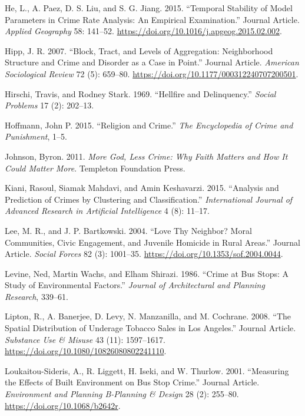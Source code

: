 \documentclass[smallextended]{svjour3}       %
\begin{document}
\leavevmode\hypertarget{ref-He2015temporal}{}%
He, L., A. Paez, D. S. Liu, and S. G. Jiang. 2015. ``Temporal Stability
of Model Parameters in Crime Rate Analysis: An Empirical Examination.''
Journal Article. \emph{Applied Geography} 58: 141--52.
\url{https://doi.org/10.1016/j.apgeog.2015.02.002}.

\leavevmode\hypertarget{ref-Hipp2007block}{}%
Hipp, J. R. 2007. ``Block, Tract, and Levels of Aggregation:
Neighborhood Structure and Crime and Disorder as a Case in Point.''
Journal Article. \emph{American Sociological Review} 72 (5): 659--80.
\url{https://doi.org/10.1177/000312240707200501}.

\leavevmode\hypertarget{ref-Hirschi1969hellfire}{}%
Hirschi, Travis, and Rodney Stark. 1969. ``Hellfire and Delinquency.''
\emph{Social Problems} 17 (2): 202--13.

\leavevmode\hypertarget{ref-Hoffmann2015religion}{}%
Hoffmann, John P. 2015. ``Religion and Crime.'' \emph{The Encyclopedia
of Crime and Punishment}, 1--5.

\leavevmode\hypertarget{ref-Johnson2011more}{}%
Johnson, Byron. 2011. \emph{More God, Less Crime: Why Faith Matters and
How It Could Matter More}. Templeton Foundation Press.

\leavevmode\hypertarget{ref-Kiani2015analysis}{}%
Kiani, Rasoul, Siamak Mahdavi, and Amin Keshavarzi. 2015. ``Analysis and
Prediction of Crimes by Clustering and Classification.''
\emph{International Journal of Advanced Research in Artificial
Intelligence} 4 (8): 11--17.

\leavevmode\hypertarget{ref-Lee2004love}{}%
Lee, M. R., and J. P. Bartkowski. 2004. ``Love Thy Neighbor? Moral
Communities, Civic Engagement, and Juvenile Homicide in Rural Areas.''
Journal Article. \emph{Social Forces} 82 (3): 1001--35.
\url{https://doi.org/10.1353/sof.2004.0044}.

\leavevmode\hypertarget{ref-Levine1986crime}{}%
Levine, Ned, Martin Wachs, and Elham Shirazi. 1986. ``Crime at Bus
Stops: A Study of Environmental Factors.'' \emph{Journal of
Architectural and Planning Research}, 339--61.

\leavevmode\hypertarget{ref-Lipton2008spatial}{}%
Lipton, R., A. Banerjee, D. Levy, N. Manzanilla, and M. Cochrane. 2008.
``The Spatial Distribution of Underage Tobacco Sales in Los Angeles.''
Journal Article. \emph{Substance Use \& Misuse} 43 (11): 1597--1617.
\url{https://doi.org/10.1080/10826080802241110}.

\leavevmode\hypertarget{ref-Loukaitou2001measuring}{}%
Loukaitou-Sideris, A., R. Liggett, H. Iseki, and W. Thurlow. 2001.
``Measuring the Effects of Built Environment on Bus Stop Crime.''
Journal Article. \emph{Environment and Planning B-Planning \& Design} 28
(2): 255--80. \url{https://doi.org/10.1068/b2642r}.
\end{document}
